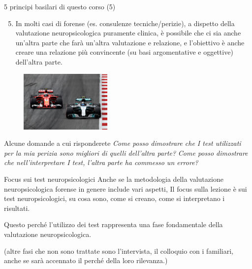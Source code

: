 \documentclass[
  ignorenonframetext,
]{beamer}
\providecommand{\tightlist}{%
  \setlength{\itemsep}{0pt}\setlength{\parskip}{0pt}}
\begin{document}
\begin{frame}{5 principi basilari di questo corso (5)}
\label{principi-basilari-di-questo-corso-5}
\begin{enumerate}
\setcounter{enumi}{4}
\tightlist
\item
  In molti casi di forense (es. consulenze tecniche/perizie), a dispetto
  della valutazione neuropsicologica puramente clinica, è possibile che
  ci sia anche un'altra parte che farà un'altra valutazione e relazione,
  e l'obiettivo è anche creare una relazione più convincente (su basi
  argomentative e oggettive) dell'altra parte. \vspace{2em}
\end{enumerate}

\pause
\begin{figure}
\includegraphics[width=0.4\textwidth]{Figures/F1_2.jpg}
\end{figure}
\end{frame}

\begin{frame}{Alcune domande a cui risponderete}
\label{alcune-domande-a-cui-risponderete}
\emph{Come posso dimostrare che I test utilizzati per la mia perizia
sono migliori di quelli dell'altra parte?} \pause \emph{Come posso
dimostrare che nell'interpretare I test, l'altra parte ha commesso un
errore?}
\end{frame}

\begin{frame}{Focus sui test neuropsicologici}
\label{focus-sui-test-neuropsicologici}
Anche se la metodologia della valutazione neuropsicologica forense in
genere include vari aspetti, Il focus sulla lezione è sui test
neuropsicologici, su cosa sono, come si creano, come si interpretano i
risultati.

Questo perché l'utilizzo dei test rappresenta una fase fondamentale
della valutazione neuropsicologica.

\pause

(altre fasi che non sono trattate sono l'intervista, il colloquio con i
familiari, anche se sarà accennato il perché della loro rilevanza.)
\end{frame}
\end{document}
